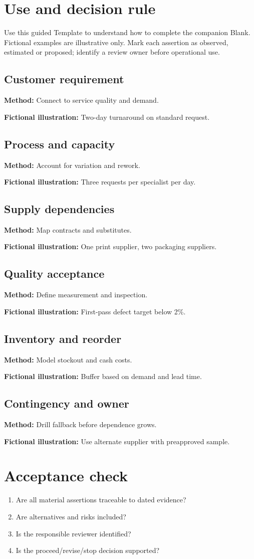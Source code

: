 \documentclass[11pt]{article}
\begin{document}
\SuiteOpen
\section{Use and decision rule}
Use this guided Template to understand how to complete the companion Blank. Fictional examples are illustrative only. Mark each assertion as observed, estimated or proposed; identify a review owner before operational use.
\subsection*{Customer requirement}
\textbf{Method:} Connect to service quality and demand.\par\textbf{Fictional illustration:} Two-day turnaround on standard request.\par
\subsection*{Process and capacity}
\textbf{Method:} Account for variation and rework.\par\textbf{Fictional illustration:} Three requests per specialist per day.\par
\subsection*{Supply dependencies}
\textbf{Method:} Map contracts and substitutes.\par\textbf{Fictional illustration:} One print supplier, two packaging suppliers.\par
\subsection*{Quality acceptance}
\textbf{Method:} Define measurement and inspection.\par\textbf{Fictional illustration:} First-pass defect target below 2\%.\par
\subsection*{Inventory and reorder}
\textbf{Method:} Model stockout and cash costs.\par\textbf{Fictional illustration:} Buffer based on demand and lead time.\par
\subsection*{Contingency and owner}
\textbf{Method:} Drill fallback before dependence grows.\par\textbf{Fictional illustration:} Use alternate supplier with preapproved sample.\par
\section{Acceptance check}
\begin{enumerate}[leftmargin=*,itemsep=5pt]
\item Are all material assertions traceable to dated evidence?
\item Are alternatives and risks included?
\item Is the responsible reviewer identified?
\item Is the proceed/revise/stop decision supported?
\end{enumerate}
\end{document}
